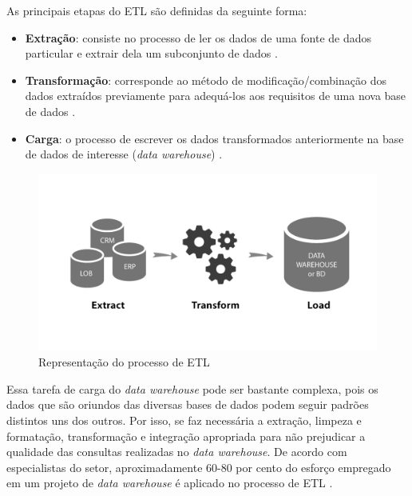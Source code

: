 As principais etapas do ETL são definidas da seguinte forma:

\begin{itemize}
  \item \textbf{Extração}: consiste no processo de ler os dados de uma fonte de dados particular e extrair dela um subconjunto de dados \cite{goarETL}.
  \item \textbf{Transformação}: corresponde ao método de modificação/combinação dos dados extraídos previamente para adequá-los aos requisitos de uma nova base de dados \cite{goarETL}.
  \item \textbf{Carga}: o processo de escrever os dados transformados anteriormente na base de dados de interesse (\textit{data warehouse}) \cite{goarETL}.
\end{itemize} 

\begin{figure}[ht]
\centering
\includegraphics[width=1\textwidth]{imagens/etl-processo.png}
\caption{Representação do processo de ETL}
\author{Fonte: https://blog.indicium.tech/etl-vs-elt-diferencas/}
\label{fig:processoETL}
\end{figure}

Essa tarefa de carga do \textit{data warehouse} pode ser bastante complexa, pois os dados que são oriundos das diversas bases de dados podem seguir padrões distintos uns dos outros. Por isso, se faz necessária a extração, limpeza e formatação, transformação e integração apropriada para não prejudicar a qualidade das consultas realizadas no \textit{data warehouse}. De acordo com especialistas do setor, aproximadamente 60-80 por cento do esforço empregado em um projeto de \textit{data warehouse} é aplicado no processo de ETL \cite{goarETL}.

